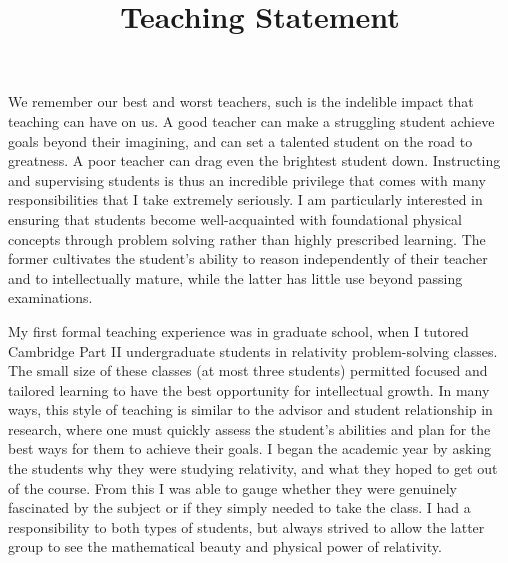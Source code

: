 \documentclass[11pt,letterpaper,sans]{moderncv} %
\title{\huge{Teaching Statement}}
\begin{document}
\makecvtitle %

\vspace{-6mm}

We remember our best and worst teachers, such is the indelible impact that teaching can have on us. A good teacher can make a struggling student achieve goals beyond their imagining, and can set a talented student on the road to greatness. A poor teacher can drag even the brightest student down. Instructing and supervising students is thus an incredible privilege that comes with many responsibilities that I take extremely seriously. %
I am particularly interested in ensuring that students become well-acquainted with foundational physical concepts through problem solving rather than highly prescribed learning. The former cultivates the student's ability to reason independently of their teacher and to intellectually mature, while the latter has little use beyond passing examinations. 
\vspace{1mm}


My first formal teaching experience was in graduate school, when I tutored Cambridge Part II undergraduate students in relativity problem-solving classes. The small size of these classes (at most three students) permitted focused and tailored learning to have the best opportunity for intellectual growth. In many ways, this style of teaching is similar to the advisor and student relationship in research, where one must quickly assess the student's abilities and plan for the best ways for them to achieve their goals. I began the academic year by asking the students why they were studying relativity, and what they hoped to get out of the course. From this I was able to gauge whether they were genuinely fascinated by the subject or if they simply needed to take the class. I had a responsibility to both types of students, but always strived to allow the latter group to see the mathematical beauty and physical power of relativity. 
\vspace{1mm}
\end{document}
